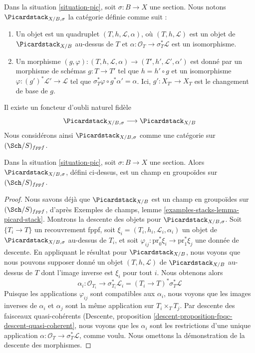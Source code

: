 \noindent
Dans la situation \ref{situation-pic}, soit $\sigma : B \to X$ une section.
Nous notons $\Picardstack_{X/B, \sigma}$ la catégorie définie comme suit :
\begin{enumerate}
\item Un objet est un quadruplet $(T, h, \mathcal{L}, \alpha)$, où
$(T, h, \mathcal{L})$ est un objet de $\Picardstack_{X/B}$ au-dessus de $T$ et
$\alpha : \mathcal{O}_T \to \sigma_T^*\mathcal{L}$ est un isomorphisme.
\item Un morphisme $(g, \varphi) : (T, h, \mathcal{L}, \alpha)
\to (T', h', \mathcal{L}', \alpha')$ est donné par un morphisme de schémas
$g : T \to T'$ tel que $h = h' \circ g$ et un isomorphisme
$\varphi : (g')^*\mathcal{L}' \to \mathcal{L}$ tel que
$\sigma_T^*\varphi \circ g^*\alpha' = \alpha$.
Ici, $g' : X_{T'} \to X_T$ est le changement de base de $g$.
\end{enumerate}
Il existe un foncteur d'oubli naturel fidèle
$$
\Picardstack_{X/B, \sigma} \longrightarrow
\Picardstack_{X/B}
$$
Nous considérons ainsi $\Picardstack_{X/B, \sigma}$ comme une catégorie
sur $(\Sch/S)_{fppf}$.

\begin{lemma}
\label{lemma-pic-with-section-stack}
Dans la situation \ref{situation-pic}, soit $\sigma : B \to X$ une section.
Alors $\Picardstack_{X/B, \sigma}$, défini ci-dessus, est un champ en
groupoïdes sur $(\Sch/S)_{fppf}$.
\end{lemma}

\begin{proof}
Nous savons déjà que $\Picardstack_{X/B}$ est un champ en groupoïdes
sur $(\Sch/S)_{fppf}$, d'après
Exemples de champs, lemme \ref{examples-stacks-lemma-picard-stack}.
Montrons la descente des objets pour $\Picardstack_{X/B, \sigma}$.
Soit $\{T_i \to T\}$ un recouvrement fppf, soit
$\xi_i = (T_i, h_i, \mathcal{L}_i, \alpha_i)$ un objet de
$\Picardstack_{X/B, \sigma}$ au-dessus de $T_i$, et soit
$\varphi_{ij} : \text{pr}_0^*\xi_i \to \text{pr}_1^*\xi_j$
une donnée de descente. En appliquant le résultat pour $\Picardstack_{X/B}$,
nous voyons que nous pouvons supposer donné un objet $(T, h, \mathcal{L})$
de $\Picardstack_{X/B}$ au-dessus de $T$ dont l'image inverse est $\xi_i$
pour tout $i$. Nous obtenons alors
$$
\alpha_i : \mathcal{O}_{T_i} \to \sigma_{T_i}^*\mathcal{L}_i =
(T_i \to T)^*\sigma_T^*\mathcal{L}
$$
Puisque les applications $\varphi_{ij}$ sont compatibles aux $\alpha_i$,
nous voyons que les images inverses de $\alpha_i$ et $\alpha_j$ sont la même
application sur $T_i \times_T T_j$. Par descente des faisceaux quasi-cohérents
(Descente, proposition \ref{descent-proposition-fpqc-descent-quasi-coherent},
nous voyons que les $\alpha_i$ sont les restrictions d'une unique application
$\alpha : \mathcal{O}_T \to \sigma_T^*\mathcal{L}$, comme voulu.
Nous omettons la démonstration de la descente des morphismes.
\end{proof}

